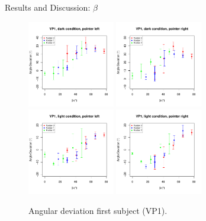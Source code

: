 \documentclass{beamer}
\begin{document}
\begin{frame}{Results and Discussion: $\beta$}
    \begin{minipage}{10cm}
        \begin{figure}
            \includegraphics[clip, trim = 0cm 0.5cm 0.5cm 0.6cm, width = 3.8cm]{Images/plots/AngleDevVP1DarkLeft.pdf}
            \includegraphics[clip, trim = 0cm 0.5cm 0.5cm 0.6cm, width = 3.8cm]{Images/plots/AngleDevVP1DarkRight.pdf}
            \includegraphics[clip, trim = 0cm 0.5cm 0.5cm 0.6cm, width = 3.8cm]{Images/plots/AngleDevVP1LightLeft.pdf}
            \includegraphics[clip, trim = 0cm 0.5cm 0.5cm 0.6cm, width = 3.8cm]{Images/plots/AngleDevVP1LightRight.pdf}
            \caption{Angular deviation first subject (VP1).}
            \label{DevVP1}
        \end{figure}
    \end{minipage}
\end{frame}
\end{document}
